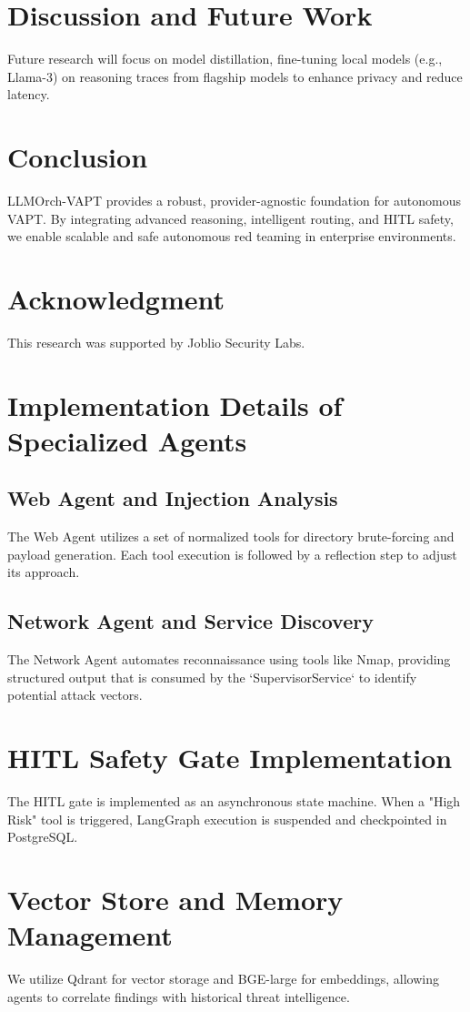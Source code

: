 \documentclass[conference,compsoc]{IEEEtran}
\begin{document}
\section{Discussion and Future Work}
Future research will focus on model distillation, fine-tuning local models (e.g., Llama-3) on reasoning traces from flagship models to enhance privacy and reduce latency.

\section{Conclusion}
LLMOrch-VAPT provides a robust, provider-agnostic foundation for autonomous VAPT. By integrating advanced reasoning, intelligent routing, and HITL safety, we enable scalable and safe autonomous red teaming in enterprise environments.

\section*{Acknowledgment}
This research was supported by Joblio Security Labs.




\appendix
\section{Implementation Details of Specialized Agents}
\subsection{Web Agent and Injection Analysis}
The Web Agent utilizes a set of normalized tools for directory brute-forcing and payload generation. Each tool execution is followed by a reflection step to adjust its approach.

\subsection{Network Agent and Service Discovery}
The Network Agent automates reconnaissance using tools like Nmap, providing structured output that is consumed by the `SupervisorService` to identify potential attack vectors.

\section{HITL Safety Gate Implementation}
The HITL gate is implemented as an asynchronous state machine. When a "High Risk" tool is triggered, LangGraph execution is suspended and checkpointed in PostgreSQL.

\section{Vector Store and Memory Management}
We utilize Qdrant for vector storage and BGE-large for embeddings, allowing agents to correlate findings with historical threat intelligence.
\end{document}
